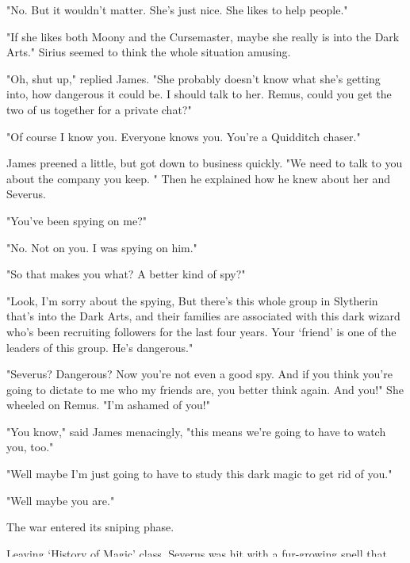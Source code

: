 "No. But it wouldn't matter. She's just nice. She likes to help people."

"If she likes both Moony and the Cursemaster, maybe she really is into the Dark Arts." Sirius seemed to think the whole situation amusing.

"Oh, shut up," replied James. "She probably doesn't know what she's getting into, how dangerous it could be. I should talk to her. Remus, could you get the two of us together for a private chat?"

"Of course I know you. Everyone knows you. You're a Quidditch chaser."

James preened a little, but got down to business quickly. "We need to talk to you about the company you keep. " Then he explained how he knew about her and Severus.

"You've been spying on me?"

"No. Not on you. I was spying on him."

"So that makes you what? A better kind of spy?"

"Look, I'm sorry about the spying, But there's this whole group in Slytherin that's into the Dark Arts, and their families are associated with this dark wizard who's been recruiting followers for the last four years. Your `friend' is one of the leaders of this group. He's dangerous."

"Severus? Dangerous? Now you're not even a good spy. And if you think you're going to dictate to me who my friends are, you{\el} better think again. And you!" She wheeled on Remus. "I'm ashamed of you!"

"You know," said James menacingly, "this means we're going to have to watch you, too."

"Well maybe I'm just going to have to study this dark magic to get rid of you."

"Well maybe you are."

The war entered its sniping phase.

Leaving `History of Magic' class, Severus was hit with a fur-growing spell that duplicated the coloration of a tortoiseshell cat. The worst part about it was that it itched, and took Miss Pomfrey two and a half hours to remove. Severus in turn placed a jinx on a third floor mirror where James liked to check the precisely tousled condition of his hair. Waiting to be sure he hit the right target, Severus then sealed the hex, leaving James with hideously crossed eyes.

A Rictusempra in Herbology sent Severus reeling backwards into a freshly transplanted stand of carnivorous plants which nibbled at his ears, nose, and fingers while he rolled on the floor giggling uncontrollably, and Wilkes and Rosier frantically helped Professor Mullein pry the fly-traps off him. Severus's retaliatory Arpague spell caused Sirius's hand to spasm at the very moment he was helping adjust Ariadne Musgrave's cloak, causing him to grab her in a way that led to a slapped face and the end of their budding relationship.

